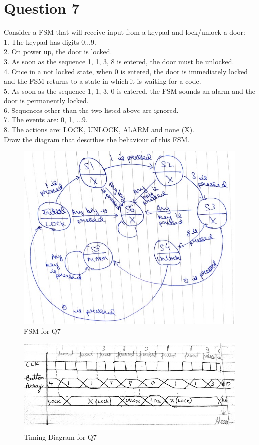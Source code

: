 \documentclass[11pt,a4paper]{article}
\begin{document}
	\section*{Question 7}
	Consider a FSM that will receive input from a keypad and lock/unlock a door:\\
	1. The keypad has digits 0...9. \\
	2. On power up, the door is locked. \\
	3. As soon as the sequence 1, 1, 3, 8 is entered, the door must be unlocked.\\
	4. Once in a not locked state, when 0 is entered, the door is immediately locked and the FSM returns to a state in which it is waiting for a code.\\
	5. As soon as the sequence 1, 1, 3, 0 is entered, the FSM sounds an alarm and the door is permanently locked.\\
	6. Sequences other than the two listed above are ignored.\\
	7. The events are: 0, 1, ...9.\\
	8. The actions are: LOCK, UNLOCK, ALARM and none (X).\\
	Draw the diagram that describes the behaviour of this FSM.\\
	\begin{figure}[H]
		\centering
		\includegraphics[scale=0.7]{images/q7fsm}
		\caption[]{FSM for Q7}
		\label{fig:q7fsm}
	\end{figure}
	\begin{figure}[H]
		\centering
		\includegraphics[width=1\linewidth]{images/q7timing}
		\caption[]{Timing Diagram for Q7}
		\label{fig:q7timing}
	\end{figure}
\end{document}
